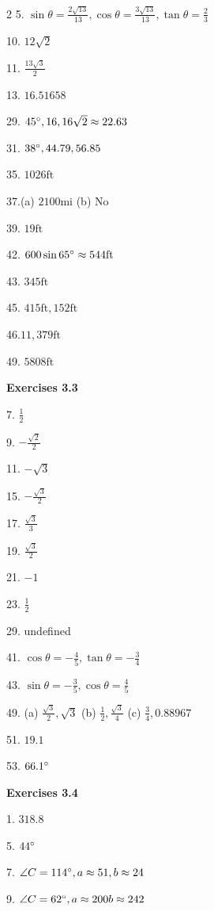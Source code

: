 \begin {multicols}{2}
5. $\sin  \theta  =\frac{2 \sqrt{13}}{13} ,\cos  \theta  =\frac{3 \sqrt{13}}{13} ,\tan  \theta  =\frac{2}{3}$ 

10. $12 \sqrt{2}$ 

11. $\frac{13 \sqrt{3}}{2}$ 

13. $16.51658$ 

29. $45 \mbox{{\ensuremath{{}^\circ}}} ,16 ,16 \sqrt{2} \approx 22.63$ 

31. $38 \mbox{{\ensuremath{{}^\circ}}} ,44.79 ,56.85$ 

35. $1026 \mbox{ft}$ 

37.(a) $2100 \mbox{mi}$ (b) No 

39. $19 \mbox{ft}$ 

42. $600 \sin  65 \mbox{{\ensuremath{{}^\circ}}} \approx 544 \mbox{ft}$ 

43. $345 \mbox{ft}$ 

45. $415 \mbox{ft} ,152 \mbox{ft}$ 

46.$11,379 \mbox{ft}$ 

49. $5808 \mbox{ft}$ 

\textbf{Exercises 3.3} 

7. $\frac{1}{2}$ 

9. $ -\frac{\sqrt{2}}{2}$ 

11. $ -\sqrt{3}$ 

15. $ -\frac{\sqrt{3}}{2}$ 

17. $\frac{\sqrt{3}}{3}$ 

19. $\frac{\sqrt{3}}{2}$ 

21. $ -1$ 

23. $\frac{1}{2}$ 

29. undefined 

41. $\cos  \theta  = -\frac{4}{5} ,\tan  \theta  = -\frac{3}{4}$ 

43. $\sin  \theta  = -\frac{3}{5} ,\cos  \theta  =\frac{4}{5}$ 

49. (a) $\frac{\sqrt{3}}{2} ,\sqrt{3}$ (b) $\frac{1}{2} ,\frac{\sqrt{3}}{4}$ (c) $\frac{3}{4} ,0.88967$ 

51. $19.1$ 

53. $66.1 \mbox{{\ensuremath{{}^\circ}}}$ 

\textbf{Exercises 3.4} 

1. $318.8$ 

5. $44 \mbox{{\ensuremath{{}^\circ}}}$ 

7. $\angle C =114 \mbox{{\ensuremath{{}^\circ}}} ,a \approx 51 ,b \approx 24$ 

9. $\angle C =62 \mbox{{\ensuremath{{}^\circ}}} ,a \approx 200 b \approx 242$ 


\end{multicols}
